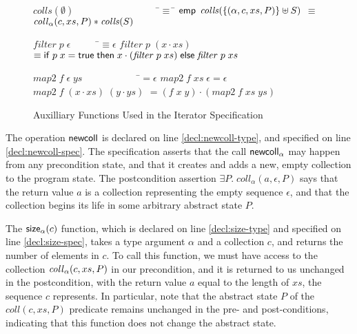 

\begin{figure}
\mbox{}
\begin{specification}
\nextline
$\mathit{colls}(\emptyset) \qquad\qquad\qquad\qquad\;\;$ \=$\equiv\;$\= $\mathsf{emp}$ 
\nextline
$\mathit{colls}(\{{(\alpha, c,xs , P)}\} \uplus S)$ \> $\equiv$ \> $\mathit{coll}_\alpha(c, xs, P) * \mathit{colls}(S)$ 

$\mathit{filter}\;p\;\epsilon \qquad\quad$\=$\equiv \epsilon$
\nextline
$\mathit{filter}\;p\;(x\cdot xs)$ \> $\equiv \mathsf{if}\;p\;x = \mathsf{true}\;\mathsf{then}\;
                                         x\cdot(\mathit{filter}\;p\;xs)\;
                                      \mathsf{else}\; \mathit{filter}\;p\;xs$ 

$\mathit{map2}\;f\;\epsilon\;ys \qquad\qquad\qquad $\=$= \epsilon$ 
\nextline
$\mathit{map2}\;f\;xs\;\epsilon $\>$= \epsilon$ 
\nextline
$\mathit{map2}\;f\;(x\cdot xs)\;(y\cdot ys)$ \>$= (f\;x\;y)\cdot(\mathit{map2}\;f\;xs\;ys)$
    
\end{specification}
\caption{Auxilliary Functions Used in the Iterator Specification}
\label{iterator-interface-aux}
\end{figure}

The operation $\mathsf{newcoll}$ is declared on line \ref{decl:newcoll-type},
and specified on line \ref{decl:newcoll-spec}. The specification
asserts that the call $\mathsf{newcoll}_\alpha$ may happen from any
precondition state, and that it creates and adds a new, empty
collection to the program state. The postcondition assertion $\exists
P.\; coll_\alpha(a, \epsilon, P)$ says that the return value $a$ is a
collection representing the empty sequence $\epsilon$, and that the
collection begins its life in some arbitrary abstract state $P$.

The $\mathsf{size}_\alpha(c)$ function, which is declared on line
\ref{decl:size-type} and specified on line \ref{decl:size-spec}, takes
a type argument $\alpha$ and a collection $c$, and returns the number
of elements in $c$. To call this function, we must have access to the
collection $\mathit{coll}_\alpha(c, xs, P)$ in our precondition, and it is
returned to us unchanged in the postcondition, with the return value
$a$ equal to the length of $xs$, the sequence $c$ represents. In
particular, note that the abstract state $P$ of the $coll(c, xs, P)$
predicate remains unchanged in the pre- and post-conditions,
indicating that this function does not change the abstract state.

